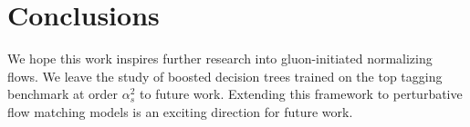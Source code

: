 \section{Conclusions}\label{sec:conclusions}

We hope this work inspires further research into gluon-initiated
normalizing flows. We leave the study of boosted decision trees trained
on the top tagging benchmark at order $\alpha_s^2$ to future work.
Extending this framework to perturbative flow matching models is an
exciting direction for future work.

